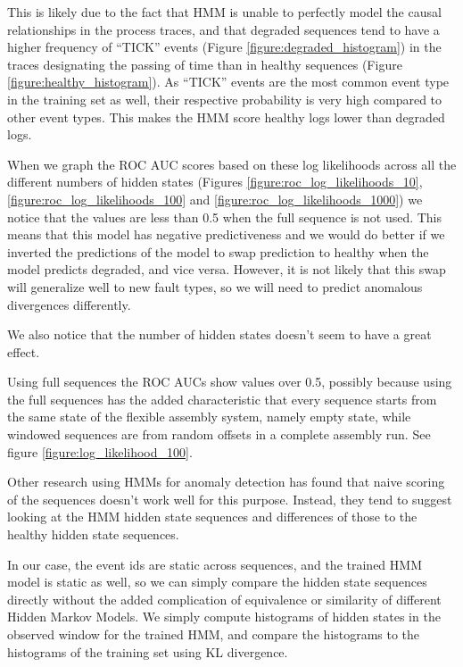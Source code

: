 \documentclass[journal]{IEEEtran}
\begin{document}
This is likely due to the fact that HMM is unable to perfectly model the causal relationships in the process traces, and that degraded sequences tend to have a higher frequency of ``TICK'' events (Figure \ref{figure:degraded_histogram}) in the traces designating the passing of time than in healthy sequences (Figure \ref{figure:healthy_histogram}). As ``TICK'' events are the most common event type in the training set as well, their respective probability is very high compared to other event types. This makes the HMM score healthy logs  lower than degraded logs.

When we graph the ROC AUC scores based on these log likelihoods across all the different numbers of hidden states (Figures \ref{figure:roc_log_likelihoods_10}, \ref{figure:roc_log_likelihoods_100} and \ref{figure:roc_log_likelihoods_1000}) we notice that the values are less than 0.5 when the full sequence is not used. This means that this model has negative predictiveness and we would do better if we inverted the predictions of the model to swap prediction to healthy when the model predicts degraded, and vice versa. However, it is not likely that this swap will generalize well to new fault types, so we will need to predict anomalous divergences differently.

We also notice that the number of hidden states doesn't seem to have a great effect.

Using full sequences the ROC AUCs show values over 0.5, possibly because using the full sequences has the added characteristic that every sequence starts from the same state of the flexible assembly system, namely empty state, while windowed sequences are from random offsets in a complete assembly run. See figure \ref{figure:log_likelihood_100}.

Other research using HMMs for anomaly detection has found that naive scoring of the sequences doesn't work well for this purpose\cite{gornitz2015hidden}. Instead, they tend to suggest looking at the HMM hidden state sequences and differences of those to the healthy hidden state sequences.

In our case, the event ids are static across sequences, and the trained HMM model is static as well, so we can simply compare the hidden state sequences directly without the added complication of equivalence or similarity of different Hidden Markov Models. We simply compute histograms of hidden states in the observed window for the trained HMM, and compare the histograms to the histograms of the training set using KL divergence.
\end{document}
